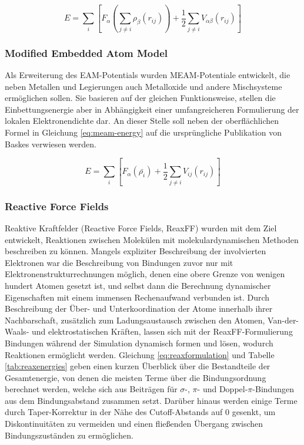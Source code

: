 \begin{equation}
  \label{eq:eam-energy}
  E = \sum_i\left[F_\alpha\left(\sum_{j\neq i}{\rho_\beta\left(r_{ij}\right)}\right) + \frac{1}{2}\sum_{j\neq i}{V_{\alpha\beta}\left(r_{ij}\right)}\right]
\end{equation}

\subsubsection{Modified Embedded Atom Model}

Als Erweiterung des EAM-Potentials wurden MEAM-Potentiale entwickelt, die neben Metallen und Legierungen auch Metalloxide und andere Mischsysteme ermöglichen sollen. 
Sie basieren auf der gleichen Funktionsweise, stellen die Einbettungsenergie aber in Abhängigkeit einer umfangreicheren Formulierung der lokalen Elektronendichte dar.
An dieser Stelle soll neben der oberflächlichen Formel in Gleichung \ref{eq:meam-energy} auf die ursprüngliche Publikation von Baskes  verwiesen werden.

\begin{equation}
  \label{eq:meam-energy}
  E = \sum_i\left[F_\alpha\left(\bar{\rho_i}\right) + \frac{1}{2}\sum_{j\neq i}{V_{ij}\left(r_{ij}\right)}\right]
\end{equation}

\subsubsection{Reactive Force Fields}

Reaktive Kraftfelder (Reactive Force Fields, ReaxFF) wurden mit dem Ziel entwickelt, Reaktionen zwischen Molekülen mit molekulardynamischen Methoden beschreiben zu können.
Mangels expliziter Beschreibung der involvierten Elektronen war die Beschreibung von Bindungen zuvor nur mit Elektronenstrukturrechnungen möglich, denen eine obere Grenze von wenigen hundert Atomen gesetzt ist, und selbst dann die Berechnung dynamischer Eigenschaften mit einem immensen Rechenaufwand verbunden ist.
Durch Beschreibung der Über- und Unterkoordination der Atome innerhalb ihrer Nachbarschaft, zusätzlich zum Ladungsaustausch zwischen den Atomen, Van-der-Waals- und elektrostatischen Kräften, lassen sich mit der ReaxFF-Formulierung Bindungen während der Simulation dynamisch formen und lösen, wodurch Reaktionen ermöglicht werden.
Gleichung \ref{eq:reaxformulation} und Tabelle \ref{tab:reaxenergies} geben einen kurzen Überblick über die Bestandteile der Gesamtenergie, von denen die meisten Terme über die Bindungsordnung berechnet werden, welche sich aus Beiträgen für $\sigma$-, $\pi$- und Doppel-$\pi$-Bindungen aus dem Bindungsabstand zusammen setzt.
Darüber hinaus werden einige Terme durch Taper-Korrektur in der Nähe des Cutoff-Abstands auf 0 gesenkt, um Diskontinuitäten zu vermeiden und einen fließenden Übergang zwischen Bindungszuständen zu ermöglichen.

